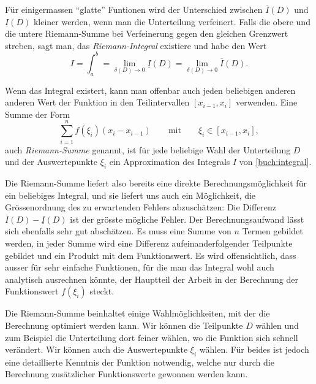 Für einigermassen ``glatte'' Funtionen wird der Unterschied zwischen
$\overline{I}(D)$ und $\underline{I}(D)$ kleiner werden, wenn man die 
Unterteilung verfeinert.
%
%
Falls die obere und die untere Riemann-Summe bei Verfeinerung gegen
den gleichen Grenzwert streben, sagt man, das {\em Riemann-Integral}
%
%
existiere und habe den Wert
\[
I
=
\int_a^b
=
\lim_{\delta(D)\to 0} \underline{I}(D)
=
\lim_{\delta(D)\to 0} \overline{I}(D).
\]

Wenn das Integral existert, kann man offenbar auch jeden beliebigen
anderen anderen Wert der Funktion in den Teilintervallen $[x_{i-1},x_i]$
verwenden.
Eine Summe der Form
\[
\sum_{i=1}^n f(\xi_i) (x_{i}-x_{i-1})
\qquad\text{mit}\qquad \xi_i \in [x_{i-1},x_i],
\]
auch {\em Riemann-Summe} genannt,
ist für jede beliebige Wahl der Unterteilung $D$ und der Auswertepunkte
$\xi_i$ ein Approximation des Integrals $I$ von \eqref{buch:integral}.
%

Die Riemann-Summe liefert also bereits eine direkte Berechnungsmöglichkeit
für ein beliebiges Integral, und sie liefert uns auch ein Möglichkeit,
die Grössenordnung des zu erwartenden Fehlers abzuschätzen:
Die Differenz $\overline{I}(D)-\underline{I}(D)$ ist der grösste mögliche
Fehler.
%
Der Berechnungsaufwand lässt sich ebenfalls sehr gut abschätzen.
Es muss eine Summe von $n$ Termen gebildet werden, in jeder Summe
wird eine Differenz aufeinanderfolgender Teilpunkte gebildet und
ein Produkt mit dem Funktionswert.
Es wird offensichtlich, dass ausser für sehr einfache Funktionen, für die
man das Integral wohl auch analytisch ausrechnen könnte, der Hauptteil der
Arbeit in der Berechnung der Funktionswert $f(\xi_i)$ steckt.

Die Riemann-Summe beinhaltet einige Wahlmöglichkeiten, mit der die
Berechnung optimiert werden kann.
Wir können die Teilpunkte $D$ wählen und zum Beispiel die Unterteilung
dort feiner wählen, wo die Funktion sich schnell verändert.
Wir können auch die Auswertepunkte $\xi_i$ wählen.
Für beides ist jedoch eine detaillierte Kenntnis der Funktion notwendig,
welche nur durch die Berechnung zusätzlicher Funktionswerte gewonnen
werden kann.

